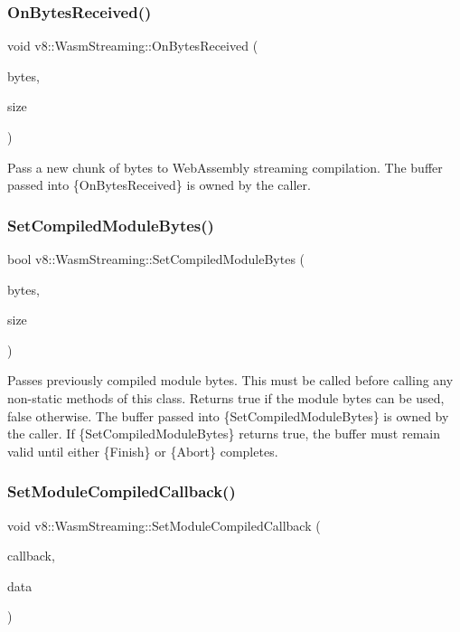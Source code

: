 \subsubsection{\texorpdfstring{On\+Bytes\+Received()}{OnBytesReceived()}}
{\footnotesize\ttfamily void v8\+::\+Wasm\+Streaming\+::\+On\+Bytes\+Received (\begin{DoxyParamCaption}\item[{const uint8\+\_\+t $\ast$}]{bytes,  }\item[{size\+\_\+t}]{size }\end{DoxyParamCaption})}

Pass a new chunk of bytes to Web\+Assembly streaming compilation. The buffer passed into \{On\+Bytes\+Received\} is owned by the caller. \mbox{\label{classv8_1_1WasmStreaming_a73a233057ae54177e84d259f43a1781e}} 
\subsubsection{\texorpdfstring{Set\+Compiled\+Module\+Bytes()}{SetCompiledModuleBytes()}}
{\footnotesize\ttfamily bool v8\+::\+Wasm\+Streaming\+::\+Set\+Compiled\+Module\+Bytes (\begin{DoxyParamCaption}\item[{const uint8\+\_\+t $\ast$}]{bytes,  }\item[{size\+\_\+t}]{size }\end{DoxyParamCaption})}

Passes previously compiled module bytes. This must be called before calling any non-\/static methods of this class. Returns true if the module bytes can be used, false otherwise. The buffer passed into \{Set\+Compiled\+Module\+Bytes\} is owned by the caller. If \{Set\+Compiled\+Module\+Bytes\} returns true, the buffer must remain valid until either \{Finish\} or \{Abort\} completes. \mbox{\label{classv8_1_1WasmStreaming_a3ab2155ed7ae2cce343e634aa46e906b}} 
\subsubsection{\texorpdfstring{Set\+Module\+Compiled\+Callback()}{SetModuleCompiledCallback()}}
{\footnotesize\ttfamily void v8\+::\+Wasm\+Streaming\+::\+Set\+Module\+Compiled\+Callback (\begin{DoxyParamCaption}\item[{\mbox{\hyperlink{classv8_1_1WasmStreaming_a2e8af849348cbd9fe9c3940ab010917d}{Module\+Compiled\+Callback}}}]{callback,  }\item[{intptr\+\_\+t}]{data }\end{DoxyParamCaption})}

